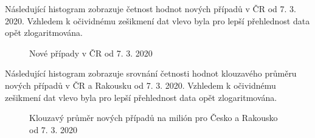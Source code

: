 \documentclass[a4paper, 12pt]{article}
\begin{document}
Následující histogram zobrazuje četnost hodnot nových případů v ČR od 7. 3. 2020.
Vzhledem k očividnému zešikmení dat vlevo byla pro lepší přehlednost data opět zlogaritmována.


\begin{figure}[H]
\centering
{}
\qquad
{}
\caption{Nové případy v ČR od 7. 3. 2020}
\end{figure}



Následující histogram zobrazuje srovnání četnosti hodnot klouzavého průměru nových případů v ČR a Rakousku od 7. 3. 2020.
Vzhledem k očividnému zešikmení dat vlevo byla pro lepší přehlednost data opět zlogaritmována.


\begin{figure}[H]
\centering
{}
\qquad
{}
\caption{Klouzavý průměr nových případů na milión pro Česko a Rakousko od 7. 3. 2020}
\end{figure}
\end{document}
